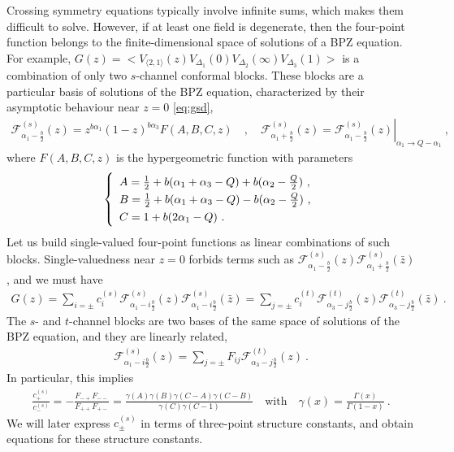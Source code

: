 \documentclass[12pt, a4paper]{article}
\theoremstyle{break}
\begin{document}
Crossing symmetry equations typically involve infinite sums, which makes them difficult to solve.
However, if at least one field is degenerate, then the four-point function belongs to the finite-dimensional space of solutions of a BPZ equation. 
For example,
$G(z)= \Big< V_{\langle 2, 1 \rangle}(z) V_{\Delta_1}(0)V_{\Delta_2}(\infty)V_{\Delta_3}(1) \Big>$ is a combination of only two $s$-channel conformal blocks.
These blocks are a particular basis of solutions of the BPZ equation, characterized by their asymptotic behaviour near $z=0$ \eqref{eq:gsd}, 
\begin{align}
\mathcal{F}^{(s)}_{\alpha_1-\frac{b}{2}}(z) = z^{b\alpha_1} (1-z)^{b\alpha_3} F(A,B,C,z)\quad , \quad 
 \mathcal{F}^{(s)}_{\alpha_1+\frac{b}{2}}(z) = \left. \mathcal{F}^{(s)}_{\alpha_1-\frac{b}{2}}(z) \right|_{\alpha_1\to Q-\alpha_1} \ ,
\label{gpm}
\end{align}
where $F(A,B,C,z)$ is the hypergeometric function with parameters
\begin{align}
\renewcommand{\arraystretch}{1.3}
\left\{\begin{array}{l}   A = \frac12 + b(\alpha_1+\alpha_3-Q) + b(\alpha_2-\tfrac{Q}{2}) \ , \\
      B = \frac12 + b(\alpha_1+\alpha_3-Q) - b(\alpha_2-\tfrac{Q}{2}) \ , \\
      C = 1 + b(2\alpha_1-Q) \ .
\end{array}\right. 
\label{abc}
\end{align}
Let us build single-valued four-point functions as linear combinations of such blocks. Single-valuedness near $z=0$ forbids terms such as $\mathcal{F}^{(s)}_{\alpha_1-\frac{b}{2}}(z) \mathcal{F}^{(s)}_{\alpha_1+\frac{b}{2}}(\bar z)$, and we must have 
\begin{align}
 G(z) = \sum_{i=\pm} c^{(s)}_{i} \mathcal{F}^{(s)}_{\alpha_1-i\frac{b}{2}}(z) \mathcal{F}^{(s)}_{\alpha_1-i\frac{b}{2}}(\bar z) = \sum_{j=\pm} c^{(t)}_{i} \mathcal{F}^{(t)}_{\alpha_3-j\frac{b}{2}}(z) \mathcal{F}^{(t)}_{\alpha_3-j\frac{b}{2}}(\bar z)\ .
\end{align}
The $s$- and $t$-channel blocks are two bases of the same space of solutions of the BPZ equation, and they are linearly related,
\begin{align}
 \mathcal{F}^{(s)}_{\alpha_1-i\frac{b}{2}}(z) = \sum_{j=\pm} F_{ij} \mathcal{F}^{(t)}_{\alpha_3-j\frac{b}{2}}(z)\ .
\end{align}
In particular, this implies 
\begin{align}
 \frac{c_{+}^{(s)}}{c_{-}^{(s)}} = -\frac{F_{-+}F_{--}}{F_{++}F_{+-}} 
 = \frac{\gamma(A)\gamma(B)\gamma(C-A)\gamma(C-B)}{\gamma(C)\gamma(C-1)}\quad \text{with} \quad \gamma(x) =\frac{\Gamma(x)}{\Gamma(1-x)}\ .
 \label{eq:coc}
\end{align}
We will later express $c_\pm^{(s)}$ in terms of three-point structure constants, and obtain equations for these structure constants.
\end{document}
